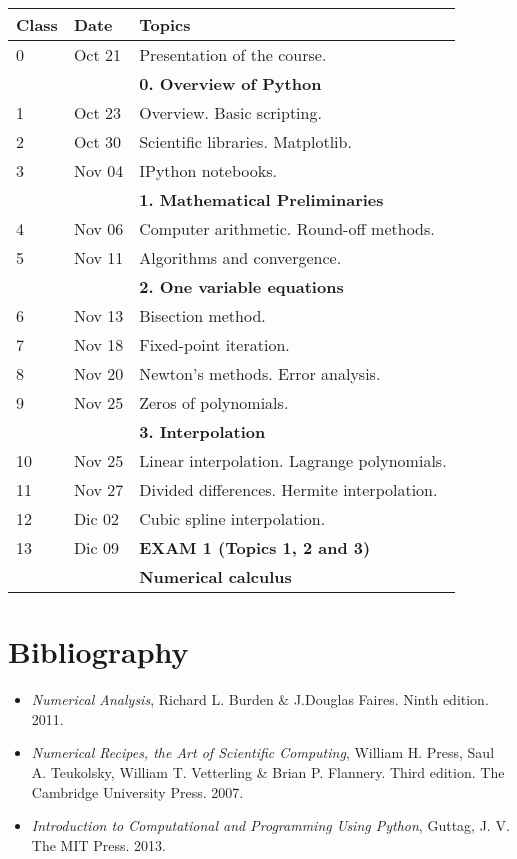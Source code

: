 \documentclass[a4,useAMS,usenatbib,usegraphicx,12pt]{article}
\begin{document}
\begin{table}[h]
\begin{flushleft}
\begin{center}
  \begin{tabular}{l  l  l} \hline\hline
	\centering\textbf{Class} & \textbf{Date} & \textbf{Topics} \\ \hline
	0 & Oct 21& Presentation of the course. \\
	& & \textbf{0. Overview of Python} \\
	1 & Oct 23& Overview. Basic scripting. \\
	2 & Oct 30& Scientific libraries. Matplotlib. \\
	3 & Nov 04& IPython notebooks. \\
	& & \textbf{1. Mathematical Preliminaries} \\
	4 & Nov 06& Computer arithmetic. Round-off methods. \\
	5 & Nov 11& Algorithms and convergence. \\
	& & \textbf{2. One variable equations} \\
	6 & Nov 13& Bisection method. \\
	7 & Nov 18& Fixed-point iteration. \\
	8 & Nov 20& Newton's methods. Error analysis. \\
	9 & Nov 25& Zeros of polynomials. \\
	& & \textbf{3. Interpolation} \\
	10 & Nov 25& Linear interpolation. Lagrange polynomials. \\
	11 & Nov 27& Divided differences. Hermite interpolation. \\
	12 & Dic 02& Cubic spline interpolation. \\
	13 & Dic 09& \textbf{EXAM 1 (Topics 1, 2 and 3)} \\ \hline
	& & \textbf{Numerical calculus} \\
	\hline\hline
  \end{tabular}  
\end{center}
\end{flushleft}
\end{table}

\section*{Bibliography}
\begin{itemize}
\item \textit{Numerical Analysis}, Richard L. Burden \& J.Douglas Faires. Ninth edition. 2011.
\item \textit{Numerical Recipes, the Art of Scientific Computing}, William H. Press, Saul A. Teukolsky,
William T. Vetterling \& Brian P. Flannery. Third edition. The Cambridge University Press. 2007.
\item \textit{Introduction to Computational and Programming Using Python}, Guttag, J. V. 
The MIT Press. 2013.
\end{itemize}

\end{document}
